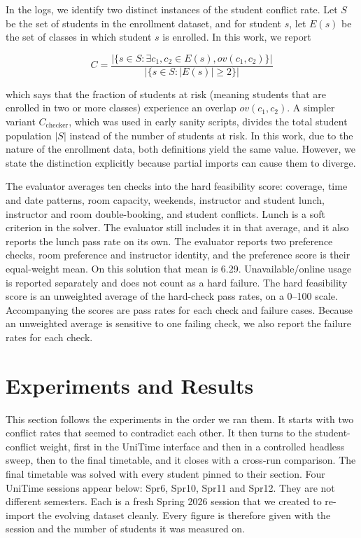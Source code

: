 \documentclass[journal]{IEEEtran}
\begin{document}
In the logs, we identify two distinct instances of the student conflict rate. Let $S$ be the set of students in the enrollment dataset, and for student $s$, let $E(s)$ be the set of classes in which student $s$ is enrolled. In this work, we report

\begin{equation}
C = \frac{|\{s\in S : \exists c_1,c_2 \in E(s), ov(c_1,c_2)\}|}{|\{s \in S : |E(s)| \geq 2 \}|}
\end{equation}

which says that the fraction of students at risk (meaning students that are enrolled in two or more classes) experience an overlap $ov(c_1, c_2)$. A simpler variant $C_{\text{checker}}$, which was used in early sanity scripts, divides the total student population $|S|$ instead of the number of students at risk. In this work, due to the nature of the enrollment data, both definitions yield the same value. However, we state the distinction explicitly because partial imports can cause them to diverge.

The evaluator averages ten checks into the hard feasibility score: coverage, time and date patterns, room capacity, weekends, instructor and student lunch, instructor and room double-booking, and student conflicts. Lunch is a soft criterion in the solver. The evaluator still includes it in that average, and it also reports the lunch pass rate on its own. The evaluator reports two preference checks, room preference and instructor identity, and the preference score is their equal-weight mean. On this solution that mean is 6.29. Unavailable/online usage is reported separately and does not count as a hard failure. The hard feasibility score is an unweighted average of the hard-check pass rates, on a 0--100 scale. Accompanying the scores are pass rates for each check and failure cases. Because an unweighted average is sensitive to one failing check, we also report the failure rates for each check.

\section{Experiments and Results}
\label{sec:results}

This section follows the experiments in the order we ran them. It starts with two conflict rates that seemed to contradict each other. It then turns to the student-conflict weight, first in the UniTime interface and then in a controlled headless sweep, then to the final timetable, and it closes with a cross-run comparison. The final timetable was solved with every student pinned to their section. Four UniTime sessions appear below: Spr6, Spr10, Spr11 and Spr12. They are not different semesters. Each is a fresh Spring 2026 session that we created to re-import the evolving dataset cleanly. Every figure is therefore given with the session and the number of students it was measured on.
\end{document}
